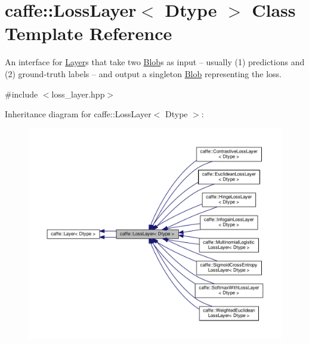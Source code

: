 \hypertarget{classcaffe_1_1_loss_layer}{}\section{caffe\+:\+:Loss\+Layer$<$ Dtype $>$ Class Template Reference}
\label{classcaffe_1_1_loss_layer}


An interface for \mbox{\hyperlink{classcaffe_1_1_layer}{Layer}}s that take two \mbox{\hyperlink{classcaffe_1_1_blob}{Blob}}s as input -- usually (1) predictions and (2) ground-\/truth labels -- and output a singleton \mbox{\hyperlink{classcaffe_1_1_blob}{Blob}} representing the loss.  




{\ttfamily \#include $<$loss\+\_\+layer.\+hpp$>$}



Inheritance diagram for caffe\+:\+:Loss\+Layer$<$ Dtype $>$\+:
\nopagebreak
\begin{figure}[H]
\begin{center}
\leavevmode
\includegraphics[width=350pt]{classcaffe_1_1_loss_layer__inherit__graph}
\end{center}
\end{figure}

